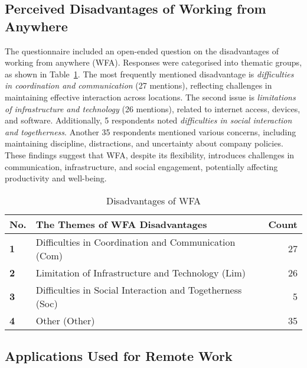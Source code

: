 \documentclass{infotel}
\begin{document}
\subsection{Perceived Disadvantages of Working from Anywhere}
\label{sec:disadvantage-wfa}

The questionnaire included an open-ended question on the disadvantages of working from anywhere (WFA). Responses were categorised into thematic groups, as shown in Table~\ref{Disadvantages of WFA}. The most frequently mentioned disadvantage is \textit{difficulties in coordination and communication} (27 mentions), reflecting challenges in maintaining effective interaction across locations. The second issue is \textit{limitations of infrastructure and technology} (26 mentions), related to internet access, devices, and software. Additionally, 5 respondents noted \textit{difficulties in social interaction and togetherness}. Another 35 respondents mentioned various concerns, including maintaining discipline, distractions, and uncertainty about company policies. These findings suggest that WFA, despite its flexibility, introduces challenges in communication, infrastructure, and social engagement, potentially affecting productivity and well-being.

\renewcommand{\arraystretch}{1.3}
\begin{table}
	\centering
	\caption{Disadvantages of WFA}
	\label{Disadvantages of WFA}
	\begin{tabular}{p{} p{} r}
		\hline
		\textbf{No.} & \textbf{The Themes of WFA Disadvantages} & \textbf{Count} \\ 
		\hline
		\textbf{1} & Difficulties in Coordination and Communication (Com) & 27 \\ 
		\textbf{2} & Limitation of Infrastructure and Technology (Lim) & 26 \\ 
		\textbf{3} & Difficulties in Social Interaction and Togetherness (Soc) & 5 \\ 
		\textbf{4} & Other (Other) & 35 \\ 
		\hline
	\end{tabular}
\end{table}


\subsection{Applications Used for Remote Work}
\label{sec:used-applications}
\end{document}
